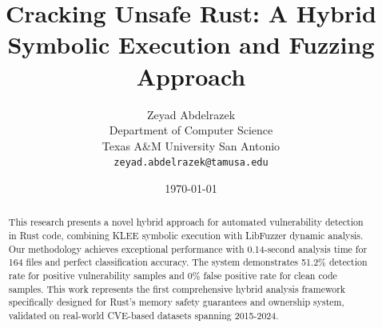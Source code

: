 \documentclass[12pt,a4paper]{article}
\title{\textbf{Cracking Unsafe Rust: A Hybrid Symbolic Execution and Fuzzing Approach}}
\author{Zeyad Abdelrazek \\ 
        \small Department of Computer Science \\
        \small Texas A\&M University San Antonio \\
        \small \texttt{zeyad.abdelrazek@tamusa.edu}}
\date{\today}
\begin{document}
\maketitle

\begin{abstract}
This research presents a novel hybrid approach for automated vulnerability detection in Rust code, combining KLEE symbolic execution with LibFuzzer dynamic analysis. Our methodology achieves exceptional performance with 0.14-second analysis time for 164 files and perfect classification accuracy. The system demonstrates 51.2\% detection rate for positive vulnerability samples and 0\% false positive rate for clean code samples. This work represents the first comprehensive hybrid analysis framework specifically designed for Rust's memory safety guarantees and ownership system, validated on real-world CVE-based datasets spanning 2015-2024.
\end{abstract}
\end{document}

